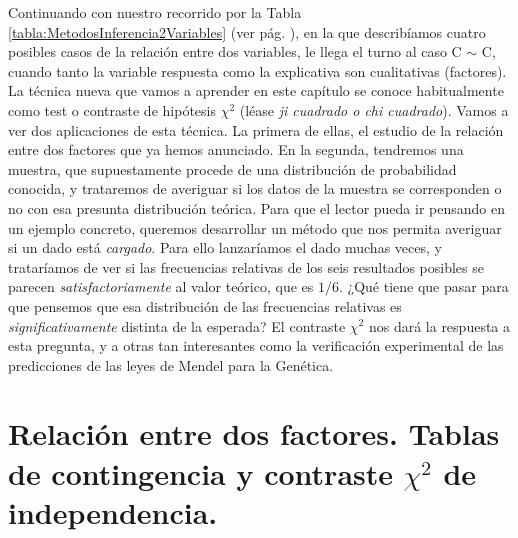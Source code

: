 

Continuando con nuestro recorrido por la Tabla \ref{tabla:MetodosInferencia2Variables} (ver pág. \pageref{tabla:MetodosInferencia2Variables}), en la que describíamos cuatro posibles casos  de la relación entre dos variables, le llega el turno al caso C $\sim$ C, cuando tanto la variable respuesta como la explicativa son cualitativas (factores). La técnica nueva que vamos a aprender en este capítulo se conoce habitualmente como test o contraste de hipótesis $\chi^2$ (léase {\em ji cuadrado o chi cuadrado}). Vamos a ver dos aplicaciones de esta técnica. La primera de ellas, el estudio de la relación entre dos factores que ya hemos anunciado. En la segunda, tendremos una muestra,  que supuestamente procede de una distribución de probabilidad conocida, y trataremos de averiguar si los datos de la muestra se corresponden o no con esa presunta distribución teórica. Para que el lector pueda ir pensando en un ejemplo concreto, queremos desarrollar un método que nos permita averiguar si un dado está {\em cargado}.  Para ello lanzaríamos el dado muchas veces, y trataríamos de ver si las frecuencias relativas de los seis resultados posibles se parecen {\em satisfactoriamente} al valor teórico, que es $1/6$.  ¿Qué tiene que pasar para que pensemos que esa distribución de las frecuencias relativas es {\em significativamente} distinta de la esperada? El contraste $\chi^2$ nos dará la respuesta a esta pregunta, y a otras tan interesantes como la verificación experimental de las predicciones de las leyes de Mendel para la Genética.


\section{Relación entre dos factores. Tablas de contingencia y contraste $\chi^2$ de independencia.}
\label{cap12:sec:TablasContingencia}

